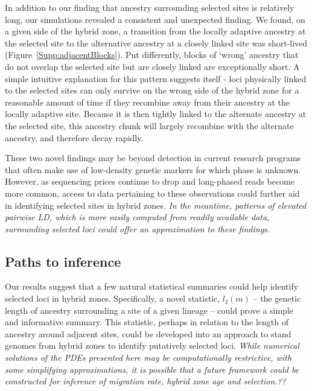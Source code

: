 \documentclass[12pt]{article}
\newcommand{\alisa}[1]{{\em \color{red} #1}}
\newcommand{\yb}[1]{{\em \color{magenta} #1}}
\begin{document}
In addition to our finding that ancestry surrounding selected sites is relatively long, our simulations revealed a consistent and unexpected finding. We found, on a given side of the hybrid zone, a transition from the locally adaptive ancestry at the selected site to the alternative ancestry at a closely linked site was short-lived (Figure~\ref{Supp:adjacentBlocks}). Put differently, blocks of `wrong' ancestry that do not overlap the selected site but are closely linked are exceptionally short. A simple intuitive explanation for this pattern suggests itself - loci physically linked to the selected sites can only survive on the wrong side of the hybrid zone for a reasonable amount of time if they recombine away from their ancestry at the locally adaptive site. Because it is then tightly linked to the alternate ancestry at the selected site, this ancestry chunk will largely recombine with the alternate ancestry, and therefore decay rapidly. 

These two novel findings may be beyond detection in current research programs that often make use of low-density genetic markers for which phase is unknown. However, as sequencing prices continue to drop and long-phased reads become more common, access to data pertaining to these observations could further aid in identifying selected sites in hybrid zones.  %
\alisa{In the meantime, patterns of elevated pairwise LD, which is more easily computed from readily available data, surrounding selected loci could offer an approximation to these findings.}

\subsection*{Paths to inference}
Our results suggest that a few natural statistical summaries could help identify selected loci in hybrid zones. 
Specifically, a novel statistic, $l_I(m)$ -- the genetic length of ancestry surrounding a site of a given lineage -- could prove a simple and informative summary. 
This statistic, perhaps in relation to the length of ancestry around adjacent sites, could be developed into an approach to stand genomes from hybrid zones to identify putatively selected loci. \alisa{While numerical solutions of the PDEs presented here may be computationally restrictive, with some simplifying approximations, it is possible that a future framework could be constructed for inference of migration rate, hybrid zone age and selection.??}
\end{document}

